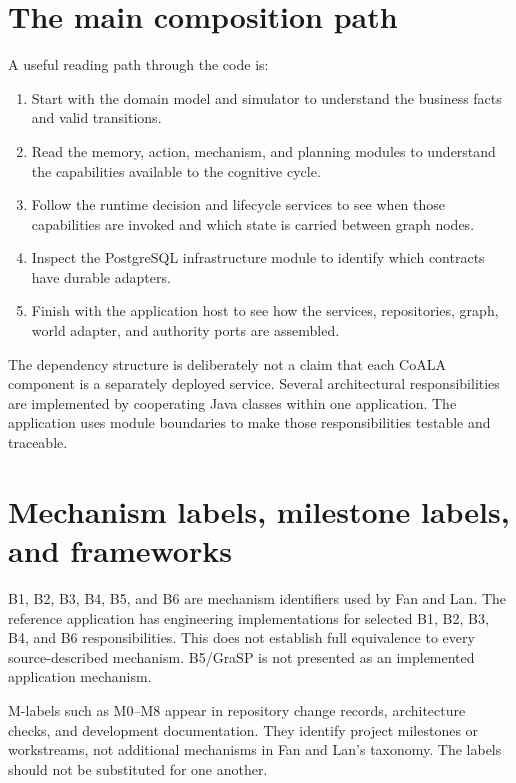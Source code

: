 \section{The main composition path}

A useful reading path through the code is:

\begin{enumerate}
  \item Start with the domain model and simulator to understand the business facts and valid transitions.
  \item Read the memory, action, mechanism, and planning modules to understand the capabilities available to the cognitive cycle.
  \item Follow the runtime decision and lifecycle services to see when those capabilities are invoked and which state is carried between graph nodes.
  \item Inspect the PostgreSQL infrastructure module to identify which contracts have durable adapters.
  \item Finish with the application host to see how the services, repositories, graph, world adapter, and authority ports are assembled.
\end{enumerate}

The dependency structure is deliberately not a claim that each CoALA component is a separately deployed service. Several architectural responsibilities are implemented by cooperating Java classes within one application. The application uses module boundaries to make those responsibilities testable and traceable.

\section{Mechanism labels, milestone labels, and frameworks}

B1, B2, B3, B4, B5, and B6 are mechanism identifiers used by Fan and Lan. The reference application has engineering implementations for selected B1, B2, B3, B4, and B6 responsibilities. This does not establish full equivalence to every source-described mechanism. B5/GraSP is not presented as an implemented application mechanism.

M-labels such as M0--M8 appear in repository change records, architecture checks, and development documentation. They identify project milestones or workstreams, not additional mechanisms in Fan and Lan's taxonomy. The labels should not be substituted for one another.

